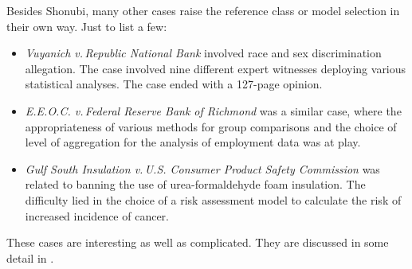\documentclass{article}
\begin{document}
Besides Shonubi, many other cases raise the reference class or model selection in their own way. Just to list a few:
\begin{itemize}
	\item \emph{Vuyanich v.\,Republic National Bank} involved race and sex discrimination allegation.  The case involved nine different  expert witnesses deploying various statistical analyses. The case ended with a 127-page opinion.
	\item \emph{E.E.O.C. v.\,Federal Reserve Bank of Richmond} was a similar case, where the appropriateness of various methods for group comparisons and the choice of level of aggregation for the analysis of employment data was at play.
	\item  \emph{Gulf South Insulation v.\,U.S. Consumer Product Safety Commission} was related to banning the use of urea-formaldehyde foam insulation. The difficulty lied in the  choice of a risk assessment model to calculate the risk of increased incidence of cancer.
\end{itemize}
These cases are interesting as well as complicated. They are discussed in some detail in \citep{fienberg1989evolving}. 
















































 
 













 
\end{document}
